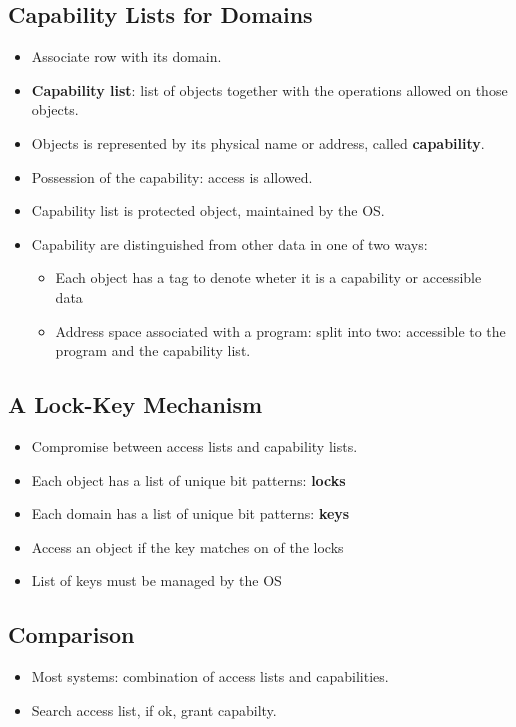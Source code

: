 \documentclass[10pt]{report}
\begin{document}
		\subsection{Capability Lists for Domains}
			\begin{itemize}
				\item Associate row with its domain.
				\item \textbf{Capability list}: list of objects together with the operations allowed on those objects.
				\item Objects is represented by its physical name or address, called \textbf{capability}.
				\item Possession of the capability: access is allowed.
				\item Capability list is protected object, maintained by the OS.
				\item Capability are distinguished from other data in one of two ways:
				\begin{itemize}
					\item Each object has a tag to denote wheter it is a capability or accessible data
					\item Address space associated with a program: split into two: accessible to the program and the capability list.
				\end{itemize}
			\end{itemize}

		\subsection{A Lock-Key Mechanism}
			\begin{itemize}
				\item Compromise between access lists and capability lists.
				\item Each object has a list of unique bit patterns: \textbf{locks}
				\item Each domain has a list of unique bit patterns: \textbf{keys}
				\item Access an object if the key matches on of the locks
				\item List of keys must be managed by the OS
			\end{itemize}

		\subsection{Comparison}
			\begin{itemize}
				\item Most systems: combination of access lists and capabilities.
				\item Search access list, if ok, grant capabilty.
			\end{itemize}
\end{document}
